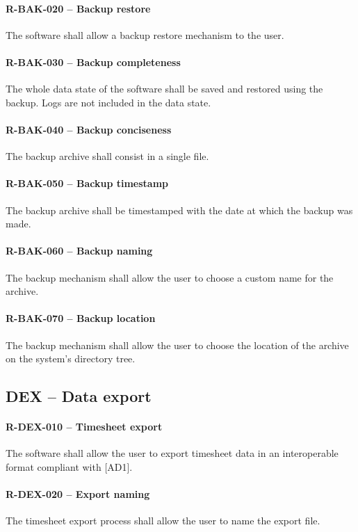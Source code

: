 \paragraph{R-BAK-020 -- Backup restore}
The software shall allow a backup restore mechanism to the user.

\paragraph{R-BAK-030 -- Backup completeness}
The whole data state of the software shall be saved and restored using the
backup. Logs are not included in the data state.

\paragraph{R-BAK-040 -- Backup conciseness}
The backup archive shall consist in a single file.

\paragraph{R-BAK-050 -- Backup timestamp}
The backup archive shall be timestamped with the date at which the backup was
made.

\paragraph{R-BAK-060 -- Backup naming}
The backup mechanism shall allow the user to choose a custom name for the
archive.

\paragraph{R-BAK-070 -- Backup location}
The backup mechanism shall allow the user to choose the location of the
archive on the system's directory tree.

\subsection{DEX -- Data export}
\paragraph{R-DEX-010 -- Timesheet export}
The software shall allow the user to export timesheet data in an interoperable
format compliant with [AD1].

\paragraph{R-DEX-020 -- Export naming}
The timesheet export process shall allow the user to name the export file.


